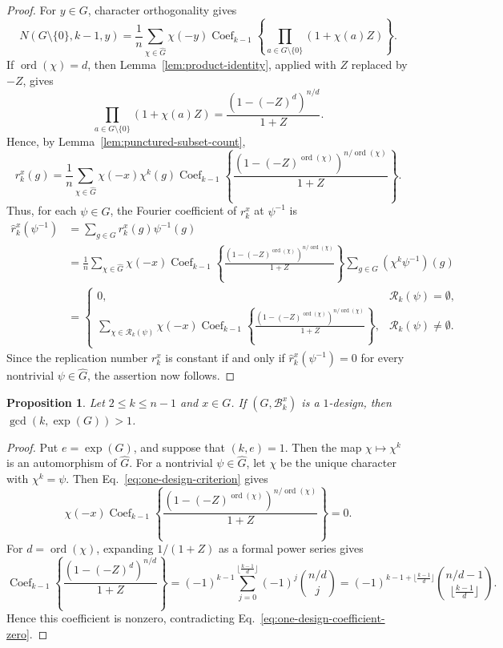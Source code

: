 \documentclass[11pt]{article}
\newtheorem{proposition}[theorem]{Proposition}
\theoremstyle{definition}
\DeclareMathOperator{\ord}{ord}
\newcommand{\cB}{\mathcal B}
\begin{document}
\begin{proof}
	For \(y\in G\), character orthogonality gives
	\[
	N(G\setminus\{0\},k-1,y)
	=
	\frac1n
	\sum_{\chi\in\widehat G}
	\chi(-y)
	\operatorname{Coef}_{k-1}\left\{
	\prod_{a\in G\setminus\{0\}}(1+\chi(a)Z)\right\}.
	\]
	If \(\ord(\chi)=d\), then Lemma~\ref{lem:product-identity}, applied with
	\(Z\) replaced by \(-Z\), gives
	\[
	\prod_{a\in G\setminus\{0\}}(1+\chi(a)Z)
	=
	\frac{(1-(-Z)^d)^{n/d}}{1+Z}.
	\]
	Hence, by Lemma~\ref{lem:punctured-subset-count},
	\[
	r_k^x(g)
	=
	\frac1n
	\sum_{\chi\in\widehat G}
	\chi(-x)\chi^k(g)
	\operatorname{Coef}_{k-1}\left\{
	\frac{(1-(-Z)^{\ord(\chi)})^{n/\ord(\chi)}}{1+Z}\right\}.
	\]
	Thus, for each \(\psi\in\widehat G\), the Fourier coefficient of
	\(r_k^x\) at \(\psi^{-1}\) is
	\[
	\begin{aligned}
		\widehat r_k^x(\psi^{-1})
		&=
		\sum_{g\in G}r_k^x(g)\psi^{-1}(g) \\
		&=
		\frac1n
		\sum_{\chi\in\widehat G}
		\chi(-x)
		\operatorname{Coef}_{k-1}\left\{
		\frac{(1-(-Z)^{\ord(\chi)})^{n/\ord(\chi)}}{1+Z}\right\}
		\sum_{g\in G}(\chi^k\psi^{-1})(g) \\
		&=
		\begin{cases}
			0,
			& \mathcal R_k(\psi)=\emptyset, \\[4pt]
			\displaystyle
			\sum_{\chi\in\mathcal R_k(\psi)}
			\chi(-x)
			\operatorname{Coef}_{k-1}\left\{
			\frac{(1-(-Z)^{\ord(\chi)})^{n/\ord(\chi)}}{1+Z}\right\},
			& \mathcal R_k(\psi)\ne\emptyset.
		\end{cases}
	\end{aligned}
	\]
	Since the replication number \(r_k^x\) is constant if and only if
	\(\widehat r_k^x(\psi^{-1})=0\) for every nontrivial
	\(\psi\in\widehat G\), the assertion now follows.
\end{proof}
\begin{proposition}\label{prop:coprime-k-exponent}
	Let \(2\le k\le n-1\) and \(x\in G\). If \((G,\cB_k^x)\) is a \(1\)-design, then
	\(\gcd(k,\exp(G))>1\).
\end{proposition}

\begin{proof}
	Put \(e=\exp(G)\), and suppose that \((k,e)=1\).  Then the map \(\chi\mapsto\chi^k\) is an automorphism of \(\widehat G\). For a nontrivial \(\psi\in\widehat G\), let \(\chi\) be the unique character with \(\chi^k=\psi\).  Then Eq.~\eqref{eq:one-design-criterion} gives
	\begin{equation}\label{eq:one-design-coefficient-zero}
		\chi(-x)
		\operatorname{Coef}_{k-1}\left\{
		\frac{(1-(-Z)^{\ord(\chi)})^{n/\ord(\chi)}}{1+Z}\right\}
		=0.
	\end{equation}
	For \(d=\ord(\chi)\), expanding \(1/(1+Z)\) as a formal power series gives
	\begin{equation}\label{eq:punctured-coefficient}
		\operatorname{Coef}_{k-1}\left\{\frac{(1-(-Z)^d)^{n/d}}{1+Z}\right\}
		=
		(-1)^{k-1}\sum_{j=0}^{\lfloor \frac{k-1}{d}\rfloor}(-1)^j\binom {n/d}{j}
		=
		(-1)^{k-1+\lfloor \frac{k-1}{d}\rfloor}\binom{n/d-1}{\lfloor \frac{k-1}{d}\rfloor}.
	\end{equation}
	Hence this coefficient is nonzero, contradicting Eq.~\eqref{eq:one-design-coefficient-zero}.
\end{proof}
\end{document}
